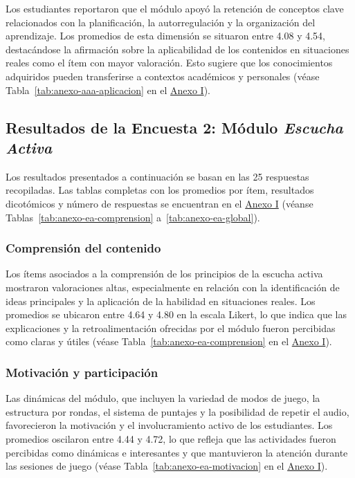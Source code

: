 Los estudiantes reportaron que el módulo apoyó la retención de conceptos clave relacionados con la planificación, la autorregulación y la organización del aprendizaje. Los promedios de esta dimensión se situaron entre 4.08 y 4.54, destacándose la afirmación sobre la aplicabilidad de los contenidos en situaciones reales como el ítem con mayor valoración. Esto sugiere que los conocimientos adquiridos pueden transferirse a contextos académicos y personales (véase Tabla~\ref{tab:anexo-aaa-aplicacion} en el \hyperref[anexo:encuestas]{Anexo I}).

\vspace{0.4cm}

\subsection{Resultados de la Encuesta 2: Módulo \textit{Escucha Activa}}

Los resultados presentados a continuación se basan en las 25 respuestas recopiladas. Las tablas completas con los promedios por ítem, resultados dicotómicos y número de respuestas se encuentran en el \hyperref[anexo:encuestas]{Anexo I} (véanse Tablas~\ref{tab:anexo-ea-comprension} a~\ref{tab:anexo-ea-global}).

\subsubsection*{Comprensión del contenido}

Los ítems asociados a la comprensión de los principios de la escucha activa mostraron valoraciones altas, especialmente en relación con la identificación de ideas principales y la aplicación de la habilidad en situaciones reales. Los promedios se ubicaron entre 4.64 y 4.80 en la escala Likert, lo que indica que las explicaciones y la retroalimentación ofrecidas por el módulo fueron percibidas como claras y útiles (véase Tabla~\ref{tab:anexo-ea-comprension} en el \hyperref[anexo:encuestas]{Anexo I}).

\subsubsection*{Motivación y participación}

Las dinámicas del módulo, que incluyen la variedad de modos de juego, la estructura por rondas, el sistema de puntajes y la posibilidad de repetir el audio, favorecieron la motivación y el involucramiento activo de los estudiantes. Los promedios oscilaron entre 4.44 y 4.72, lo que refleja que las actividades fueron percibidas como dinámicas e interesantes y que mantuvieron la atención durante las sesiones de juego (véase Tabla~\ref{tab:anexo-ea-motivacion} en el \hyperref[anexo:encuestas]{Anexo I}).

